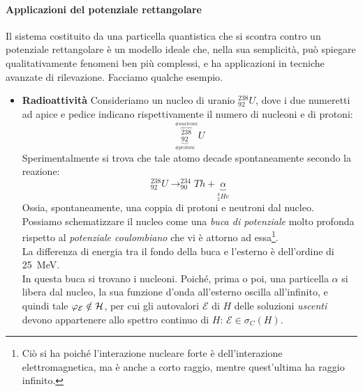 \documentclass[../../FisicaTeorica.tex]{subfiles}
\begin{document}

\paragraph{Applicazioni del potenziale rettangolare\\}
Il sistema costituito da una particella quantistica che si scontra contro un potenziale rettangolare è un modello ideale che, nella sua semplicità, può spiegare qualitativamente fenomeni ben più complessi, e ha applicazioni in tecniche avanzate di rilevazione. Facciamo qualche esempio.
\begin{itemize}
\item 
\textbf{Radioattività} Consideriamo un nucleo di uranio $^{238}_{92}U$, dove i due numeretti ad apice e pedice indicano rispettivamente il numero di nucleoni e di protoni:
\[
^{\overbrace{238}^{\#nucleoni}}_{\underbrace{92}_{\#protoni}}U
\]
Sperimentalmente si trova che tale atomo decade spontaneamente secondo la reazione:
\[
^{238}_{92}U \to ^{234}_{90}Th+\underbrace{\alpha}_{^4_2 He}
\]
Ossia, spontaneamente, una coppia di protoni e neutroni  dal nucleo.\\
Possiamo schematizzare il nucleo come una \textit{buca di potenziale} molto profonda rispetto al \textit{potenziale coulombiano} che vi è attorno ad essa\footnote{Ciò si ha poiché l'interazione nucleare forte è  dell'interazione elettromagnetica, ma è anche a corto raggio, mentre quest'ultima ha raggio infinito.}.\\
La differenza di energia tra il fondo della buca e l'esterno è dell'ordine di \SI{25}{\mega\eV}.\\
In questa buca si trovano i nucleoni. Poiché, prima o poi, una particella $\alpha$ si libera dal nucleo, la sua funzione d'onda all'esterno oscilla all'infinito, e quindi tale $\varphi_\mathcal{E} \notin \mathcal{H}$, per cui gli autovalori $\mathcal{E}$ di $H$ delle soluzioni \textit{uscenti} devono appartenere allo spettro continuo di $H$: $\mathcal{E}\in \sigma_C(H)$.\\

\end{itemize}
\end{document}
